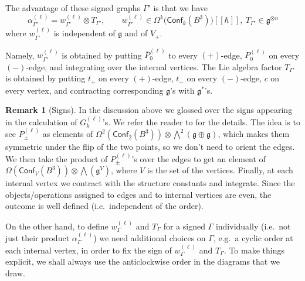 \documentclass[a4paper]{amsart}
\theoremstyle{plain}
\theoremstyle{definition}
\newtheorem*{rem}{Remark}
\newcommand{\on}{\operatorname}
\newcommand{\g}{\mathfrak{g}}
\newcommand{\bw}{{\textstyle\bigwedge}}
\newcommand{\cf}{\mathsf{Conf}}
\begin{document}
The advantage of these signed graphs $\Gamma'$ is that we have
$$\alpha^{(\ell)}_{\Gamma'} = w^{(\ell)}_{\Gamma'}\otimes T_{\Gamma'},\qquad w^{(\ell)}_{\Gamma'}\in\Omega^k\bigl(\cf_k(B^3)\bigr)[\![\hbar]\!],\ T_{\Gamma'}\in\g^{\otimes n}$$
where $w^{(\ell)}_{\Gamma'}$ is independent of $\g$ and of $V_+$.

Namely, $w^{(\ell)}_{\Gamma'}$ is obtained by putting $\bar P^{(\ell)}_0$ to every  $(+)$-edge, $P^{(\ell)}_0$ on every  $(-)$-edge, and integrating over the internal vertices. The Lie algebra factor $T_{\Gamma'}$ is obtained by putting $t_+$ on every $(+)$-edge, $t_-$ on every $(-)$-edge, $c$ on every vertex, and contracting corresponding $\g$'s with $\g^*$'s.

\begin{rem}[Signs] 
In the discussion above we glossed over the signs appearing in the calculation of $G_k^{(\ell)}$'s. 
We  refer the reader to \cite{AS} for the details. The idea is to see $P_\pm^{(\ell)}$ as elements of $\Omega^2(\cf_2(B^3))\otimes\bw^2(\g\oplus\g)$, which makes them symmetric under the flip of the two points, so we don't need to orient the edges. We then take the product of $P_\pm^{(\ell)}$'s over the edges to get an element of $\Omega(\cf_V(B^3))\otimes\bw(\g^V)$, where $V$ is the set of the vertices. Finally, at each internal vertex we contract with the structure constants and integrate. Since the objects/operations assigned to edges and to internal vertices are even, the outcome is well defined (i.e.\ independent of the order).

On the other hand, to define $w^{(\ell)}_{\Gamma}$ and $T_{\Gamma}$ for a signed $\Gamma$ individually (i.e.\ not just their product $\alpha^{(\ell)}_{\Gamma}$) we need additional choices on $\Gamma$, e.g.\ a cyclic order at each internal vertex, in order to fix the sign of $w^{(\ell)}_{\Gamma}$ and $T_{\Gamma}$. To make things explicit, we shall always use the anticlockwise order in the diagrams that we draw.
\end{rem}

\end{document}
